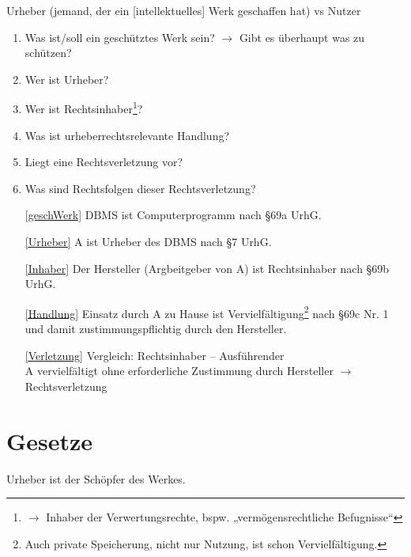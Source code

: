 \documentclass{scrreprt}
\begin{document}
Urheber (jemand, der ein [intellektuelles] Werk geschaffen hat) vs Nutzer
\begin{enumerate}[label=\arabic*.]
\item \label{geschWerk} Was ist/soll ein geschütztes Werk sein? $\to$ Gibt es überhaupt was zu schützen?
\item \label{Urheber} Wer ist Urheber?
\item \label{Inhaber} Wer ist Rechtsinhaber\footnote{$\to$ Inhaber der Verwertungsrechte, bspw. „vermögensrechtliche Befugnisse“}?
\item \label{Handlung} Was ist urheberrechtsrelevante Handlung?
\item \label{Verletzung} Liegt eine Rechtsverletzung vor?
\item \label{Folgen} Was sind Rechtsfolgen dieser Rechtsverletzung?
\end{enumerate}



\begin{enumerate}
\item[\ref{geschWerk}] DBMS ist Computerprogramm nach §69a UrhG.
\item[\ref{Urheber}] A ist Urheber des DBMS nach §7 UrhG.
\item[\ref{Inhaber}] Der Hersteller (Argbeitgeber von A) ist Rechtsinhaber nach §69b UrhG.
\item[\ref{Handlung}] Einsatz durch A zu Hause ist Vervielfältigung\footnote{Auch private Speicherung, nicht nur Nutzung, ist schon Vervielfältigung.} nach §69c Nr. 1 und damit zustimmungspflichtig durch den Hersteller.
\item[\ref{Verletzung}] Vergleich: Rechtsinhaber -- Ausführender\\
A vervielfältigt ohne erforderliche Zustimmung durch Hersteller $\to$ Rechtsverletzung
\end{enumerate}

\part{Gesetze}

Urheber ist der Schöpfer des Werkes.

\end{document}
